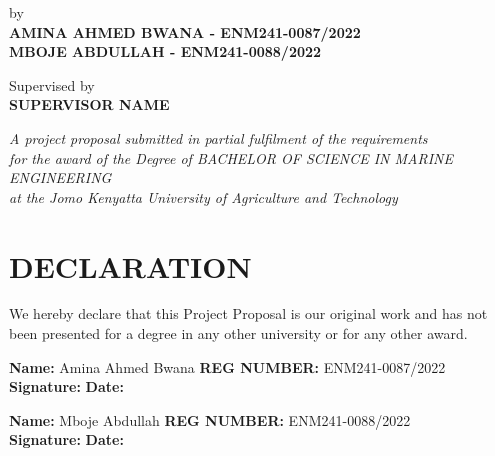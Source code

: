 \documentclass[12pt, a4paper]{report}
\begin{document}
\begin{titlepage}
\begin{center}
{{\normalsize by}\\[0.25cm]
{\large \textbf{AMINA AHMED BWANA - ENM241-0087/2022}}\\[0.1cm]

{\large \textbf{MBOJE ABDULLAH - ENM241-0088/2022}}\\[0.1cm]

\vspace{0.5cm}

{\normalsize Supervised by}\\[0.2cm]
{\large \textbf{SUPERVISOR NAME}}

\vfill

{\footnotesize \textit{A project proposal submitted in partial fulfilment of the requirements}}\\
{\footnotesize \textit{for the award of the Degree of BACHELOR OF SCIENCE IN MARINE ENGINEERING}}\\
{\footnotesize \textit{at the Jomo Kenyatta University of Agriculture and Technology}}\\

}
\end{center}
\end{titlepage}
\hypersetup{pageanchor=true}



\section*{DECLARATION}

We hereby declare that this Project Proposal is our original work and has not been presented for a degree in any other university or for any other award.

\vspace{1cm}
\noindent
\textbf{Name:} Amina Ahmed Bwana \hfill \textbf{REG NUMBER:} ENM241-0087/2022\\
\vspace{0.5cm}
\noindent
\textbf{Signature:} \underline{\hspace{5cm}} \hfill \textbf{Date:} \underline{\hspace{4cm}}

\vspace{1cm}
\noindent
\textbf{Name:} Mboje Abdullah \hfill \textbf{REG NUMBER:} ENM241-0088/2022\\
\vspace{0.5cm}
\noindent
\textbf{Signature:} \underline{\hspace{5cm}} \hfill \textbf{Date:} \underline{\hspace{4cm}}
\end{document}
